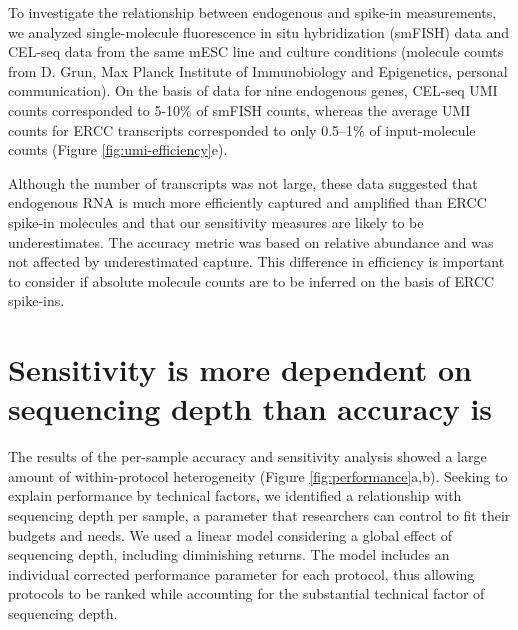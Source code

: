 To investigate the relationship between endogenous and spike-in measurements, we analyzed single-molecule fluorescence in situ hybridization (smFISH) data and CEL-seq data from the same mESC line and culture conditions \cite{Grun2014-fx} (molecule counts from D. Grun, Max Planck Institute of Immunobiology and Epigenetics, personal communication). On the basis of data for nine endogenous genes, CEL-seq UMI counts corresponded to 5-10\% of smFISH counts, whereas the average UMI counts for ERCC transcripts corresponded to only 0.5–1\% of input-molecule counts (Figure \ref{fig:umi-efficiency}e).

Although the number of transcripts was not large, these data suggested that endogenous RNA is much more efficiently captured and amplified than ERCC spike-in molecules and that our sensitivity measures are likely to be underestimates. The accuracy metric was based on relative abundance and was not affected by underestimated capture. This difference in efficiency is important to consider if absolute molecule counts are to be inferred on the basis of ERCC spike-ins.

\section{Sensitivity is more dependent on sequencing depth than accuracy is}

The results of the per-sample accuracy and sensitivity analysis showed a large amount of within-protocol heterogeneity (Figure \ref{fig:performance}a,b). Seeking to explain performance by technical factors, we identified a relationship with sequencing depth per sample, a parameter that researchers can control to fit their budgets and needs. We used a linear model considering a global effect of sequencing depth, including diminishing returns. The model includes an individual corrected performance parameter for each protocol, thus allowing protocols to be ranked while accounting for the substantial technical factor of sequencing depth.

